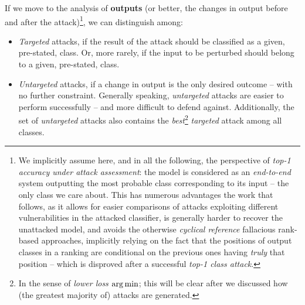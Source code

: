 If we move to the analysis of \textbf{outputs} (or better, the changes in output before and after the attack)\footnote{We implicitly assume here, and in all the following, the perspective of \textit{top-1 accuracy under attack assessment}: the model is considered as an \textit{end-to-end} system outputting the most probable class corresponding to its input -- the only class we care about. This has numerous advantages \wrt the work that follows, as it allows for easier comparisons of attacks exploiting different vulnerabilities in the attacked classifier, is generally harder to recover \wrt the unattacked model, and avoids the otherwise \textit{cyclical reference} fallacious rank-based approaches, implicitly relying on the fact that the positions of output classes in a ranking are conditional on the previous ones having \textit{truly} that position -- which is disproved after a successful \textit{top-1 class attack}.}, we can distinguish among:
\begin{itemize}
    \item \textit{Targeted} attacks, if the result of the attack should be classified as a given, pre-stated, class. Or, more rarely, if the input to be perturbed should belong to a given, pre-stated, class.
    \item \textit{Untargeted} attacks, if a change in output is the only desired outcome -- with no further constraint. Generally speaking, \textit{untargeted} attacks are easier to perform successfully -- and more difficult to defend against. Additionally, the set of \textit{untargeted} attacks also contains the \textit{best}\footnote{In the sense of \textit{lower loss $\operatorname*{arg\,min}$}; this will be clear after we discussed how (the greatest majority of) attacks are generated.} \textit{targeted} attack among all classes.
\end{itemize}

